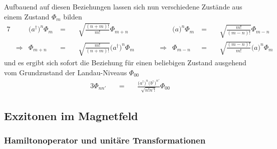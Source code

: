 \documentclass[a4paper,11pt, twoside]{article}
\newcommand{\ind}[2]{{_{#1}^{#2}}}
\newcommand{\+}{\dagger}
\renewcommand{\'}{\tt\textquotesingle}
\renewcommand{\a}{a\ind{}{\+}}
\renewcommand{\b}{b\ind{}{\+}}
\renewcommand{\it}{\mathit}
\renewcommand{\^}{\hat}
\renewcommand{\~}{\widetilde}
\begin{document}
Aufbauend auf diesen Beziehungen lassen sich nun verschiedene Zustände aus einem Zustand $\it{\Phi}_{m}$ bilden
\begin{alignat*}{7}
&& \big (\a \big )^n \it{\Phi}_m &\ = \ && \sqrt{\tfrac{(n+m)!}{m!}}\it{\Phi}_{m+n} & \qquad && \big (a \big )^n \it{\Phi}_m  &\ = \ && \sqrt{\tfrac{m!}{(m-n)!}}\it{\Phi}_{m-n} \\[8pt]
&\Rightarrow & \it{\Phi}_{m+n} &\ = \ && \sqrt{\tfrac{m!}{(n+m)!}}\big (\a \big )^n\it{\Phi}_{m} & \qquad & \Rightarrow & \it{\Phi}_{m-n} &\ = \ && \sqrt{\tfrac{(m-n)!}{m!}}\big (a \big )^n\it{\Phi}_{m}
\end{alignat*}
und es ergibt sich sofort die Beziehung für einen beliebigen Zustand ausgehend vom Grundzustand der Landau-Niveaus $\it{\Phi}_{00}$
\begin{alignat*}{3}
\it{\Phi}_{nn'} &&\ = \ && \frac{\big(\a \big)^n\big(\b \big)^{n'}}{\sqrt{n!n'!}}\it{\Phi}_{00}
\end{alignat*}
\subsection{Exzitonen im Magnetfeld}
\subsubsection{Hamiltonoperator und unitäre Transformationen}



\newpage
\end{document}
